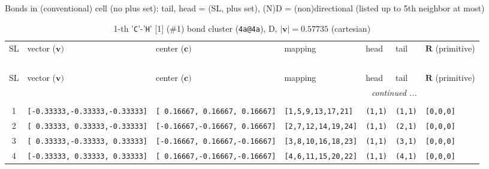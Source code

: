 \documentclass[fleqn,10pt,landscape]{jsarticle}
\begin{document}
\noindent Bonds in (conventional) cell (no plus set): tail, head = (SL, plus set), (N)D = (non)directional (listed up to 5th neighbor at most)

\renewcommand{\arraystretch}{1.6}
\begin{longtable}[l]{cllllll}
\captionsetup{justification=raggedright, singlelinecheck=off}
\caption{1-th '\texttt{C}'-'\texttt{H}' [1] (\#1) bond cluster (\texttt{4a@4a}), D, $|\bm{v}|=0.57735$ (cartesian)}
 \\
 \hline \hline
SL & vector ($\bm{v})$ & center ($\bm{c})$ & mapping & head & tail & $\bm{R}$ (primitive) \\ \hline \endfirsthead

\multicolumn{6}{l}{\tablename\ \thetable{}} \\
 \hline \hline
SL & vector ($\bm{v})$ & center ($\bm{c})$ & mapping & head & tail & $\bm{R}$ (primitive) \\ \hline \endhead

 \hline \hline
\multicolumn{6}{r}{\footnotesize\it continued ...} \\ \endfoot

 \hline \hline
\multicolumn{6}{r}{} \\ \endlastfoot

1 & \texttt{[-0.33333,-0.33333,-0.33333]} & \texttt{[ 0.16667, 0.16667, 0.16667]} & \texttt{[1,5,9,13,17,21]} & \texttt{(1,1)} & \texttt{(1,1)} & \texttt{[0,0,0]} \\ \hline
2 & \texttt{[ 0.33333, 0.33333,-0.33333]} & \texttt{[-0.16667,-0.16667, 0.16667]} & \texttt{[2,7,12,14,19,24]} & \texttt{(1,1)} & \texttt{(2,1)} & \texttt{[0,0,0]} \\ \hline
3 & \texttt{[ 0.33333,-0.33333, 0.33333]} & \texttt{[-0.16667, 0.16667,-0.16667]} & \texttt{[3,8,10,16,18,23]} & \texttt{(1,1)} & \texttt{(3,1)} & \texttt{[0,0,0]} \\ \hline
4 & \texttt{[-0.33333, 0.33333, 0.33333]} & \texttt{[ 0.16667,-0.16667,-0.16667]} & \texttt{[4,6,11,15,20,22]} & \texttt{(1,1)} & \texttt{(4,1)} & \texttt{[0,0,0]} \\
\end{longtable}
\renewcommand{\arraystretch}{1.6}
\end{document}
